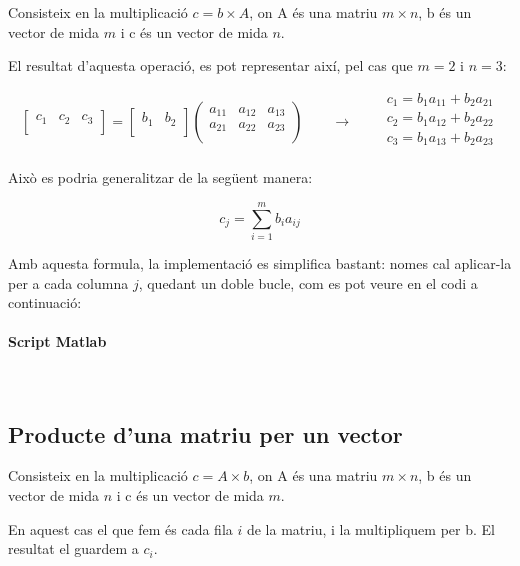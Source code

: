 \documentclass[11pt,a4paper,twoside]{report}
\begin{document}
Consisteix en la multiplicació $c = b \times A$, on A és una matriu $m \times n$, b és un vector de mida $m$ i c és un vector de mida $n$.

El resultat d'aquesta operació, es pot representar així, pel cas que $m = 2$ i $n = 3$:

 \[
 	\begin{bmatrix}
		  	c_1	&	c_2	& c_3	\\
\end{bmatrix} = 
 	\begin{bmatrix}
		  	b_1	&	b_2	\\
\end{bmatrix}
 	\begin{pmatrix}
		  	a_{11}	&	a_{12} & a_{13}\\
		  	a_{21}	&	a_{22} & a_{23}\\
\end{pmatrix}
\qquad \longrightarrow \qquad
 \begin{matrix} 
 c_1 = b_1 a_{11} + b_2 a_{21} \\
 c_2 = b_1 a_{12} + b_2 a_{22} \\
 c_3 = b_1 a_{13} + b_2 a_{23} \\
 \end{matrix}
 \]

Això es podria generalitzar de la següent manera:

\[
 c_j = \sum_{i=1}^{m} b_i a_{ij}
\]

Amb aquesta formula, la implementació es simplifica bastant: nomes cal aplicar-la per a cada columna $j$, quedant un doble bucle, com es pot veure en el codi a continuació:

\paragraph*{Script Matlab} \mbox{} \\



\subsection{Producte d'una matriu per un vector}
Consisteix en la multiplicació $c = A \times b$, on A és una matriu $m \times n$, b és un vector de mida $n$ i c és un vector de mida $m$.

En aquest cas el que fem és cada fila $i$ de la matriu, i la multipliquem per b. El resultat el guardem a $c_i$. \\ \\
\end{document}
